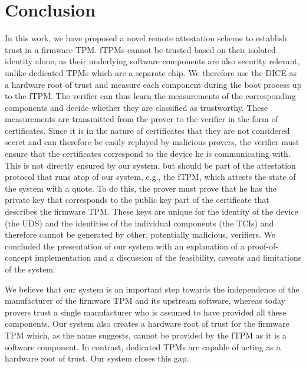 \section{Conclusion}

In this work, we have proposed a novel remote attestation scheme to establish trust in a firmware TPM\@.
fTPMs cannot be trusted based on their isolated identity alone, as their underlying software components are also security relevant, unlike dedicated TPMs which are a separate chip.
We therefore use the DICE as a hardware root of trust and measure each component during the boot process up to the fTPM\@.
The verifier can thus learn the measurements of the corresponding components and decide whether they are classified as trustworthy.
These measurements are transmitted from the prover to the verifier in the form of certificates.
Since it is in the nature of certificates that they are not considered secret and can therefore be easily replayed by malicious provers, the verifier must ensure that the certificates correspond to the device he is communicating with.
This is not directly ensured by our system, but should be part of the attestation protocol that runs atop of our system, e.g., the fTPM, which attests the state of the system with a quote.
To do this, the prover must prove that he has the private key that corresponds to the public key part of the certificate that describes the firmware TPM\@.
These keys are unique for the identity of the device (the \ac{UDS}) and the identities of the individual components (the TCIs) and therefore cannot be generated by other, potentially malicious, verifiers.
We concluded the presentation of our system with an explanation of a proof-of-concept implementation and a discussion of the feasibility, caveats and limitations of the system.

We believe that our system is an important step towards the independence of the manufacturer of the firmware TPM and its upstream software, whereas today provers trust a single manufacturer who is assumed to have provided all these components.
Our system also creates a hardware root of trust for the firmware TPM which, as the name suggests, cannot be provided by the fTPM as it is a software component.
In contrast, dedicated TPMs are capable of acting as a hardware root of trust.
Our system closes this gap.
